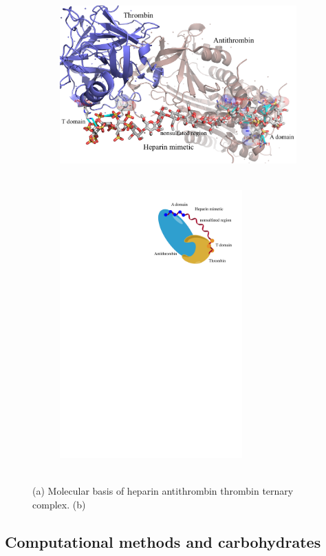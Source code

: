 \documentclass[journal=jctcce,manuscript=article]{achemso}
\begin{document}
{{\begin{figure}
    \begin{subfigure}[b]{0.49\textwidth}
        {\hspace{0cm}}\includegraphics[width=10cm]{images/1TB6.png}
        \caption{$ $}
    \end{subfigure}
    \begin{subfigure}[b]{0.49\textwidth}
        \hspace{2cm}\includegraphics[width=7cm]{images/1tb6.pdf}
    \caption{$ $}
    \end{subfigure}
    
    \caption{(a) Molecular basis of heparin antithrombin thrombin ternary complex. (b) }
    \label{fig:thrombin}
\end{figure}


}

\pagebreak
\subsection{Computational methods and carbohydrates}

}
\end{document}
